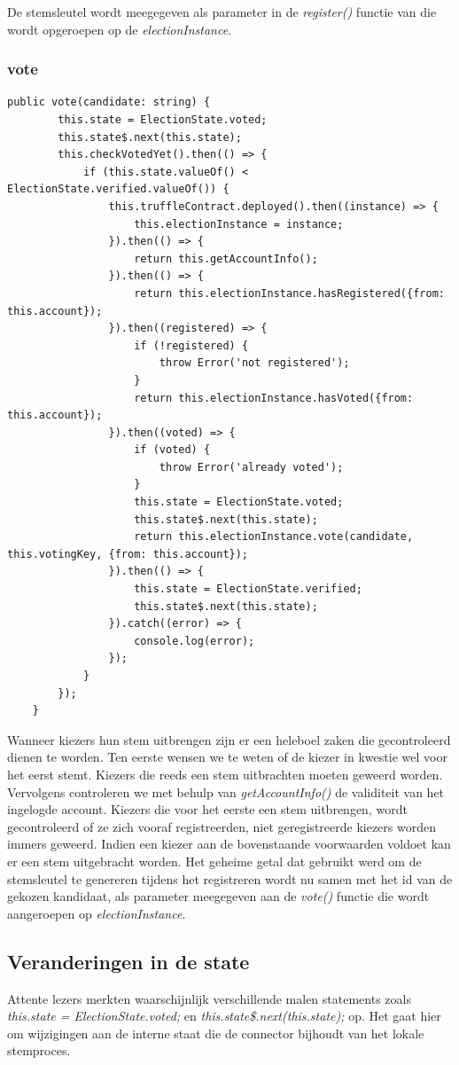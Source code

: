 		De stemsleutel wordt meegegeven als parameter in de \textit{register()} functie van die wordt opgeroepen op de \textit{electionInstance}.
	\subsubsection{vote}
	\lstset{language=JavaScriptSolidity} 
	\begin{lstlisting}[numbers=none]
	public vote(candidate: string) {
		this.state = ElectionState.voted;
		this.state$.next(this.state);
		this.checkVotedYet().then(() => {
			if (this.state.valueOf() < ElectionState.verified.valueOf()) {
				this.truffleContract.deployed().then((instance) => {
					this.electionInstance = instance;
				}).then(() => {
					return this.getAccountInfo();
				}).then(() => {
					return this.electionInstance.hasRegistered({from: this.account});
				}).then((registered) => {
					if (!registered) {
						throw Error('not registered');
					}
					return this.electionInstance.hasVoted({from: this.account});
				}).then((voted) => {
					if (voted) {
						throw Error('already voted');
					}
					this.state = ElectionState.voted;
					this.state$.next(this.state);
					return this.electionInstance.vote(candidate, this.votingKey, {from: this.account});
				}).then(() => {
					this.state = ElectionState.verified;
					this.state$.next(this.state);
				}).catch((error) => {
					console.log(error);
				});
			}
		});
	}
	\end{lstlisting}
	Wanneer kiezers hun stem uitbrengen zijn er een heleboel zaken die gecontroleerd dienen te worden. Ten eerste wensen we te weten of de kiezer in kwestie 
	wel voor het eerst stemt. Kiezers die reeds een stem uitbrachten moeten geweerd worden. Vervolgens controleren we met behulp van \textit{getAccountInfo()} de validiteit van het ingelogde account. Kiezers die voor het eerste een stem uitbrengen, wordt gecontroleerd of ze zich vooraf registreerden, niet geregistreerde kiezers worden immers geweerd. Indien een kiezer aan de bovenstaande voorwaarden voldoet kan er een stem uitgebracht worden. Het geheime getal dat gebruikt werd om de stemsleutel te genereren tijdens het registreren wordt nu samen met het id van de gekozen kandidaat, als parameter meegegeven aan de \textit{vote()} functie die wordt aangeroepen op \textit{electionInstance}.
	\subsection{Veranderingen in de state}
	Attente lezers merkten waarschijnlijk verschillende malen statements zoals \textit{this.state = ElectionState.voted;} en \textit{this.state\$.next(this.state);} op. Het gaat hier om wijzigingen aan de interne staat die de connector bijhoudt van het lokale stemproces.
	

